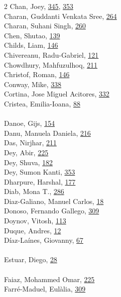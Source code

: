 \documentclass[11pt,oneside]{book}
\begin{document}
\begin{multicols}{2}
Chan, Joey, \hyperlink{page.345}{345}, \hyperlink{page.353}{353}\\
Charan, Guddanti Venkata Sree, \hyperlink{page.264}{264}\\
Charan, Suhani Singh, \hyperlink{page.260}{260}\\
Chen, Shutao, \hyperlink{page.139}{139}\\
Childs, Liam, \hyperlink{page.146}{146}\\
Chivereanu, Radu-Gabriel, \hyperlink{page.121}{121}\\
Chowdhury, Mahfuzulhoq, \hyperlink{page.211}{211}\\
Christof, Roman, \hyperlink{page.146}{146}\\
Conway, Mike, \hyperlink{page.338}{338}\\
Cortina, Jose Miguel Acitores, \hyperlink{page.332}{332}\\
Cristea, Emilia-Ioana, \hyperlink{page.88}{88}\\
\\ %
Danoe, Gijs, \hyperlink{page.154}{154}\\
Danu, Manuela Daniela, \hyperlink{page.216}{216}\\
Das, Nirjhar, \hyperlink{page.211}{211}\\
Dey, Abir, \hyperlink{page.225}{225}\\
Dey, Shuva, \hyperlink{page.182}{182}\\
Dey, Sumon Kanti, \hyperlink{page.353}{353}\\
Dharpure, Harshal, \hyperlink{page.177}{177}\\
Diab, Mona T., \hyperlink{page.286}{286}\\
Diaz-Galiano, Manuel Carlos, \hyperlink{page.18}{18}\\
Donoso, Fernando Gallego, \hyperlink{page.309}{309}\\
Doynov, Vitosh, \hyperlink{page.113}{113}\\
Duque, Andres, \hyperlink{page.12}{12}\\
Díaz-Laínes, Giovanny, \hyperlink{page.67}{67}\\
\\ %
Estuar, Diego, \hyperlink{page.28}{28}\\
\\ %
Faiaz, Mohammed Omar, \hyperlink{page.225}{225}\\
Farré-Maduel, Eulàlia, \hyperlink{page.309}{309}\\

\end{multicols}
\end{document}
